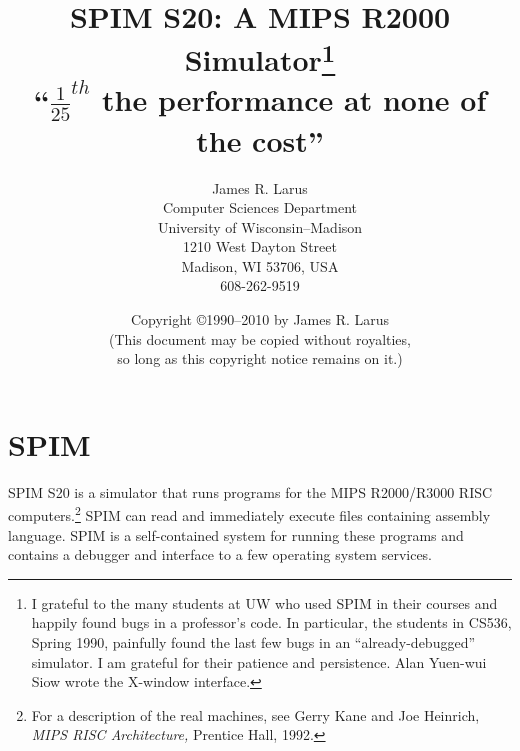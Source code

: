 \documentclass[11pt]{article}
\begin{document}
\title{SPIM S20: A MIPS R2000 Simulator\thanks
{I grateful to the many students at UW who used SPIM in their courses
and happily found bugs in a professor's code.  In particular, the
students in CS536, Spring 1990, painfully found the last few bugs in
an ``already-debugged'' simulator.  I am grateful for their patience
and persistence.  Alan Yuen-wui Siow wrote the X-window interface.}
\\
{\small ``$\frac{1}{25}^{th}$ the performance at none of 	the
cost''}}

\author{{\normalsize James R. Larus} \\
	{\normalsize Computer Sciences Department} \\
	{\normalsize University of Wisconsin--Madison} \\
	{\normalsize 1210 West Dayton Street} \\
	{\normalsize Madison, WI 53706, USA} \\
	{\normalsize 608-262-9519}}

\date{Copyright \copyright 1990--2010 by James R. Larus \\
      (This document may be copied without royalties, \\
	so long as this copyright notice remains on it.)}

\maketitle


\newcommand {\pinst} [2]%
	{\bigskip\noindent{\em{{\tt #1}\hfill#2 ${}^{\dagger}$\newline}}}
\newcommand {\inst} [2]%
	 {\bigskip\noindent{\em{{\tt #1}\hfill#2\newline}}}
\newcommand {\pinstX} [2]%
	{\noindent{\em{{\tt #1}\hfill#2 ${}^{\dagger}$\newline}}}
\newcommand {\instX} [2]%
	{\noindent{\em{{\tt #1}\hfill#2\newline}}}


\section{SPIM}

SPIM S20 is a simulator that runs programs for the MIPS R2000/R3000 RISC
computers.\footnote{For a description of the real machines, see Gerry Kane
and Joe Heinrich, {\em MIPS RISC Architecture,\/} Prentice Hall, 1992.} SPIM
can read and immediately execute files containing assembly language.  SPIM
is a self-contained system for running these programs and contains a
debugger and interface to a few operating system services.
\end{document}
